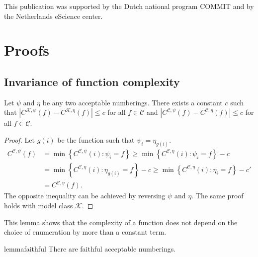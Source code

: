 \documentclass{style/llncs}
\newcommand{\C}{\mathscr C}
\newcommand{\K}{\mathscr K}
\begin{document}
\subsubsection*{\ackname}

This publication was supported by the Dutch national program COMMIT and by  the Netherlands eScience center.




\appendix

\section{Proofs}

\subsection{Invariance of function complexity}

\begin{lemma}
Let $\psi$ and $\eta$ be any two acceptable numberings. There exists a constant $c$ such that $\left| C^{\K,\psi}(f) - C^{\K, \eta}(f)\right | \leq c$ for all $f \in \C$ and $\left| C^{\C,\psi}(f) - C^{\C, \eta}(f)\right | \leq c$ for all $f \in \C$. \label{lemma:invariance}
\end{lemma}
\begin{proof}
Let $g(i)$ be the function such that $\psi_i=\eta_{g(i)}$.
\begin{align*}
C^{\C,\psi}(f) &= \min\left\{ C^{\C,\psi}(i) : \psi_i= f\right\} 
\geq \min\left\{ C^{\C, \eta}(i) : \psi_i= f\right\} - c\\
&= \min\left\{ C^{\C, \eta}(i) : \eta_{g(i)}= f\right\} - c
\geq \min\left\{ C^{\C, \eta}(i) : \eta_i= f\right\} - c' \\
&= C^{\C, \eta}(f).
\end{align*}
The opposite inequality can be achieved by reversing $\psi$ and $\eta$. The same proof holds with model class $\K$.
\end{proof}
This lemma shows that the complexity of a function does not depend on the choice of
enumeration by more than a constant term.


\begin{restatable}{lemma}{faithful}\label{lemma:faithful-numberings}
  There are faithful acceptable numberings.
\end{restatable}
\end{document}
